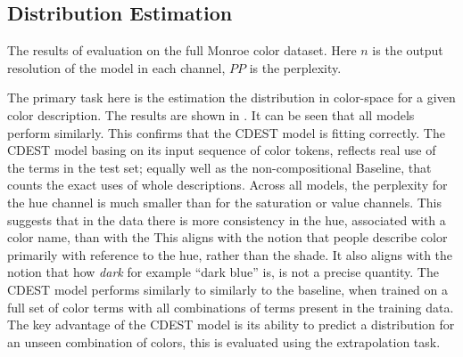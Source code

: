\documentclass[11pt,letterpaper]{article}
\begin{document}
\subsection{Distribution Estimation}

\begin{table}
	\centering
	\caption{\label{tblresfull} The results of evaluation on the full Monroe color dataset. Here $n$ is the output resolution of the model in each channel, $PP$ is the perplexity.}
\end{table}

The primary task here is the estimation the distribution in color-space for a given color description.
The results are shown in .
It can be seen that all models perform similarly.
This confirms that the CDEST model is fitting correctly.
The CDEST model basing on its input sequence of color tokens,
reflects real use of the terms in the test set; 
equally well as the non-compositional Baseline, that counts the exact uses of whole descriptions.
Across all models, the perplexity for the hue channel is much smaller than for the saturation or value channels.
This suggests that in the data there is more consistency in the hue, associated with a color name, than with the 
This aligns with the notion that people describe color primarily with reference to the hue, rather than the shade.
It also aligns with the notion that how \emph{dark} for example ``dark blue'' is, is not a precise quantity.
The CDEST model performs similarly to similarly to the baseline, when trained on a full set of color terms with all combinations of terms present in the training data.
The key advantage of the CDEST model is its ability to predict a distribution for an unseen combination of colors, this is evaluated using the extrapolation task.
\end{document}
